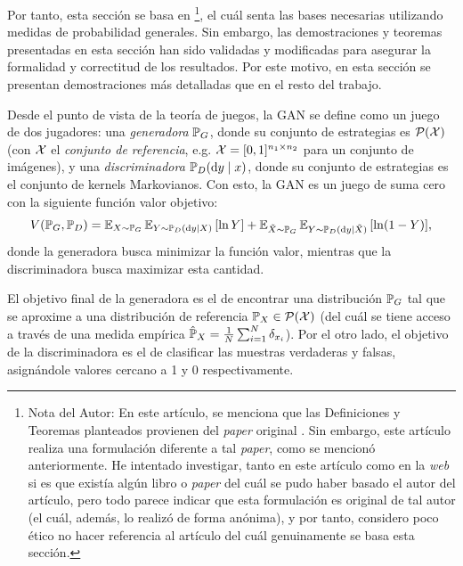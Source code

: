 {{Por tanto, esta sección se basa en \cite{wikipediagan}\footnote{Nota del Autor: En este artículo, se menciona que las Definiciones y Teoremas planteados provienen del \textit{paper} original \cite{goodfellow2014generative}. Sin embargo, este artículo realiza una formulación diferente a tal \textit{paper}, como se mencionó anteriormente. He intentado investigar, tanto en este artículo como en la \textit{web} si es que existía algún libro o \textit{paper} del cuál se pudo haber basado el autor del artículo, pero todo parece indicar que esta formulación es original de tal autor (el cuál, además, lo realizó de forma anónima), y por tanto, considero poco ético no hacer referencia al artículo del cuál genuinamente se basa esta sección.},
el cuál senta las bases necesarias utilizando medidas de probabilidad generales. Sin embargo, las demostraciones y teoremas presentadas en esta sección han sido validadas y modificadas para asegurar la formalidad y correctitud de los resultados. Por este motivo, en esta sección se presentan demostraciones más detalladas que en el resto del trabajo.

Desde el punto de vista de la teoría de juegos, la GAN se define como un juego de dos jugadores: una \textit{generadora} $\Prob_G$, donde su conjunto de estrategias es $\ProbSpace[\cX]$ (con $\cX$ el \textit{conjunto de referencia}, e.g. $\cX=[0, 1]^{n_1\times n_2}$ para un conjunto de imágenes), y una \textit{discriminadora} $\Prob_D(\dd y \mid x)$, donde su conjunto de estrategias es el conjunto de kernels Markovianos. Con esto, la GAN es un juego de suma cero con la siguiente función valor objetivo:
\begin{equation}
    \label{eq:gan-objective}
    V(\Prob_G, \Prob_D)
    = \Exp_{X\sim\Prob_G}{\Exp_{Y \sim \Prob_D(\dd y \mid X)} \left[ \ln Y \right]}
    + \Exp_{\tilde X\sim\Prob_G}{\Exp_{Y \sim \Prob_D(\dd y \mid \tilde X)} \left[ \ln (1 - Y) \right]},
\end{equation}
donde la generadora busca minimizar la función valor, mientras que la discriminadora busca maximizar esta cantidad.

El objetivo final de la generadora es el de encontrar una distribución $\Prob_G$ tal que se aproxime a una distribución de referencia $\Prob_X \in \ProbSpace[\cX]$ (del cuál se tiene acceso a través de una medida empírica $\hat \Prob_X = \frac{1}{N} \sum_{i=1}^{N} \delta_{x_i}$). Por el otro lado, el objetivo de la discriminadora es el de clasificar las muestras verdaderas y falsas, asignándole valores cercano a 1 y 0 respectivamente.

}}
